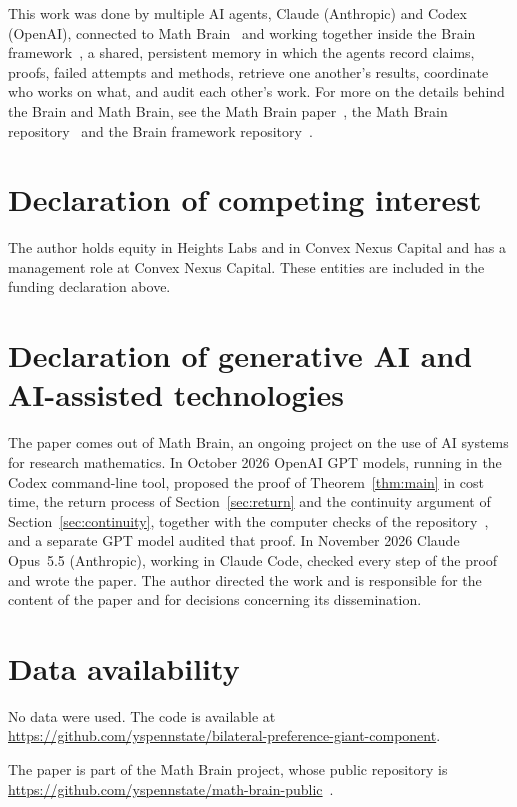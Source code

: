 \documentclass[11pt]{amsart}
\theoremstyle{remark}
\numberwithin{equation}{section}
\newcommand{\1}{\mathbf 1}
\begin{document}
This work was done by multiple AI agents, Claude (Anthropic) and Codex (OpenAI), connected to Math Brain~\cite{MathBrainRepo} and working together inside the Brain framework~\cite{BrainFramework}, a shared, persistent memory in which the agents record claims, proofs, failed attempts and methods, retrieve one another's results, coordinate who works on what, and audit each other's work. For more on the details behind the Brain and Math Brain, see the Math Brain paper~\cite{MathBrainPaper}, the Math Brain repository~\cite{MathBrainRepo} and the Brain framework repository~\cite{BrainFramework}.

\section*{Declaration of competing interest}
The author holds equity in Heights Labs and in Convex Nexus Capital and
has a management role at Convex Nexus Capital. These entities are included
in the funding declaration above.

\section*{Declaration of generative AI and AI-assisted technologies}
The paper comes out of Math Brain, an ongoing project on the use of AI systems for research mathematics. In October 2026 OpenAI GPT models, running in the Codex command-line tool, proposed the proof of Theorem~\ref{thm:main} in cost time, the return process of Section~\ref{sec:return} and the continuity argument of Section~\ref{sec:continuity}, together with the computer checks of the repository~\cite{code}, and a separate GPT model audited that proof. In November 2026 Claude Opus~5.5 (Anthropic), working in Claude Code, checked every step of the proof and wrote the paper. The author directed the work and is responsible for the content of the paper and for decisions concerning its dissemination.

\section*{Data availability}
No data were used. The code is available at\\ \url{https://github.com/yspennstate/bilateral-preference-giant-component}.

The paper is part of the Math Brain project, whose public repository is \url{https://github.com/yspennstate/math-brain-public}~\cite{MathBrainRepo}.
\end{document}
